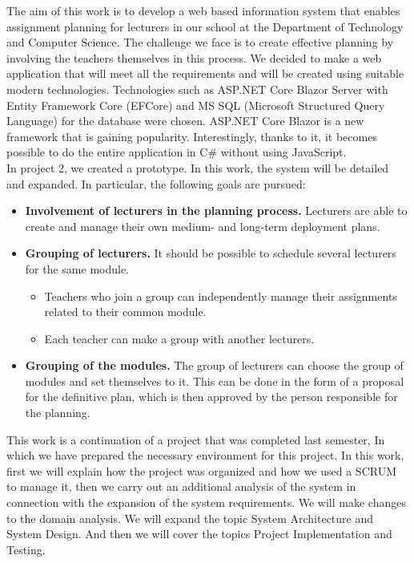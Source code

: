 \documentclass{scrartcl}
\begin{document}
The aim of this work is to develop a web based information system that enables assignment planning for lecturers in our school at the Department of Technology and Computer Science.
The challenge we face is to create effective planning by involving the teachers themselves in this process. We decided to make a web application that will meet all the requirements and will be created using suitable modern technologies. Technologies such as ASP.NET Core Blazor Server with Entity Framework Core (EFCore) and MS SQL (Microsoft Structured Query Language) for the database were chosen. ASP.NET Core Blazor is a new framework that is gaining popularity. Interestingly, thanks to it, it becomes possible to do the entire application in C\# without using JavaScript.\\

In project 2, we created a prototype. In this work, the system will be detailed and expanded. In particular, the following goals are pursued:
\begin{itemize}
\item \textbf{Involvement of lecturers in the planning process.}
Lecturers are able to create and manage their own medium- and long-term deployment plans.
\item \textbf{Grouping of lecturers.} It should be possible to schedule several lecturers for the same module.
   \begin{itemize}
   \item Teachers who join a group can independently manage their assignments related to their common module.
   \item Each teacher can make a group with another lecturers.
   \end{itemize}
 \item \textbf{Grouping of the modules.} The group of lecturers can  choose the group of modules and set themselves to it. This can be done in the form of a proposal for the definitive plan, which is then approved by the person responsible for the planning.
\end{itemize}


This work is a continuation of a project that was completed last semester, In which we have prepared the necessary environment for this project. 
In this work, first we will explain how 	the project was organized and how we used a SCRUM to manage it, then we  carry out an additional analysis of the system in connection with the expansion of the system requirements. We will make changes to the domain analysis. We will expand the topic System Architecture and System Design. And then we will cover the topics Project Implementation and Testing.
\end{document}
